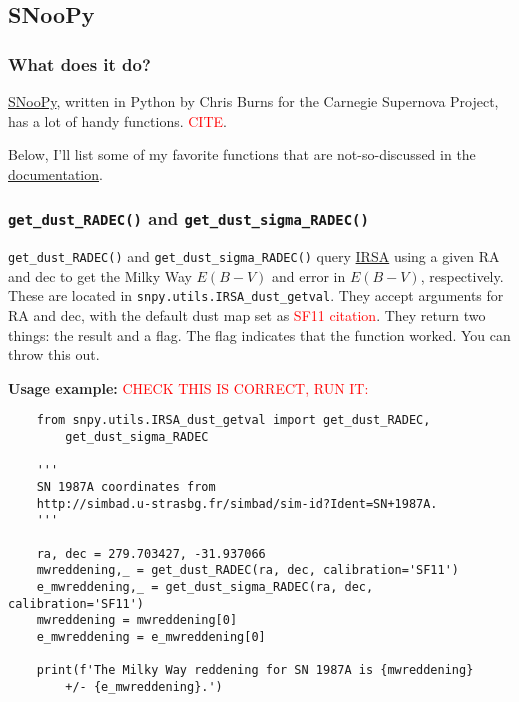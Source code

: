 \subsection{SNooPy}

\subsubsection{What does it do?}
\href{https://github.com/obscode/snpy}{SNooPy}, written in Python by Chris Burns for the Carnegie Supernova Project, has a lot of handy functions. \textcolor{red}{CITE}. 

Below, I'll list some of my favorite functions that are not-so-discussed in the \href{https://csp.obs.carnegiescience.edu/data/snpy/documentation}{documentation}. 

\subsubsection{\texttt{get\_dust\_RADEC()} and \texttt{get\_dust\_sigma\_RADEC()}}

\par
\texttt{get\_dust\_RADEC()} and \texttt{get\_dust\_sigma\_RADEC()} query \href{https://irsa.ipac.caltech.edu/frontpage/}{IRSA} using a given RA and dec to get the Milky Way $E(B-V)$ and error in $E(B-V)$, respectively. These are located in \texttt{snpy.utils.IRSA\_dust\_getval}. They accept arguments for RA and dec, with the default dust map set as \textcolor{red}{SF11 citation}. They return two things: the result and a flag. The flag indicates that the function worked. You can throw this out. 

\par

\noindent\textbf{Usage example:}
\textcolor{red}{CHECK THIS IS CORRECT, RUN IT:}
\begin{verbatim}
    from snpy.utils.IRSA_dust_getval import get_dust_RADEC, 
        get_dust_sigma_RADEC

    '''
    SN 1987A coordinates from 
    http://simbad.u-strasbg.fr/simbad/sim-id?Ident=SN+1987A.
    '''

    ra, dec = 279.703427, -31.937066
    mwreddening,_ = get_dust_RADEC(ra, dec, calibration='SF11')
    e_mwreddening,_ = get_dust_sigma_RADEC(ra, dec, calibration='SF11')
    mwreddening = mwreddening[0]
    e_mwreddening = e_mwreddening[0]

    print(f'The Milky Way reddening for SN 1987A is {mwreddening}
        +/- {e_mwreddening}.')

\end{verbatim}
